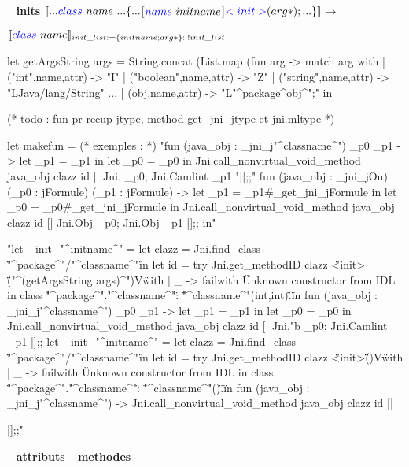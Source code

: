\documentclass[a4paper, 11pt]{report}
\begin{document}
\ 
\newline
\noindent
\textbf{ inits }
\newline
\noindent
$[\![... {\color{blue}class}\  name\ ... \{ ...
    $[$ {\color{blue}name}\ initname $]${\color{blue} <init>} (arg*); ...\} ]\!]$$\longrightarrow$
% 

$[\![{\color{blue}class}\  name ]\!]_{init\_list:=\{initname;arg*\}::!init\_list}$

\begin{OCaml}

let getArgsString args =
String.concat (List.map (fun arg -> 
   match arg with
   | ("int",name,attr) -> "I"
   | ("boolean",name,attr) -> "Z"
   | ("string",name,attr) -> "LJava/lang/String"
     ...
   | (obj,name,attr) -> "L"^package^obj^";"
in

(* todo : fun pr recup jtype, method get_jni_jtype et jni.mltype *)

let makefun = (* exemples : *)
 "fun (java_obj : _jni_j"^classname^") _p0 _p1 ->
      let _p1 = _p1 in
      let _p0 = _p0
      in
        Jni.call_nonvirtual_void_method java_obj clazz id
          [| Jni. _p0; Jni.Camlint _p1 "|];;" 
 fun (java_obj : _jni_jOu) (_p0 : jFormule) (_p1 : jFormule) ->
      let _p1 = _p1#_get_jni_jFormule in
      let _p0 = _p0#_get_jni_jFormule
      in
        Jni.call_nonvirtual_void_method java_obj clazz id
          [| Jni.Obj _p0; Jni.Obj _p1 |];;
in"

"let _init_"^initname^" =
  let clazz = Jni.find_class \""^package^"/"^classname^"\" in
  let id =
    try Jni.get_methodID clazz \"<init>\" \"("^(getArgsString args)^")V\"
    with
    | _ ->
        failwith
          \"Unknown constructor from IDL in class \""^package^"."^classname^"\" : \""^classname^"(int,int)\".\"
  in
    fun (java_obj : _jni_j"^classname^") _p0 _p1 ->
      let _p1 = _p1 in
      let _p0 = _p0
      in
        Jni.call_nonvirtual_void_method java_obj clazz id
          [| Jni."^^" _p0; Jni.Camlint _p1 |];;
let _init_"^initname^" =
  let clazz = Jni.find_class \""^package^"/"^classname^"\" in
  let id =
    try Jni.get_methodID clazz \"<init>\" \"()V\"
    with
    | _ ->
        failwith
          \"Unknown constructor from IDL in class \""^package^"."^classname^"\" : \""^classname^"()\".\"
  in
    fun (java_obj : _jni_j"^classname^") ->
      Jni.call_nonvirtual_void_method java_obj clazz id [| 

       |];;"

\end{OCaml}
\ 
\newline
\noindent
\textbf{ attributs }
\newline
\noindent
\ 
\newline
\noindent
\textbf{ methodes }
\newline
\noindent
\end{document}
